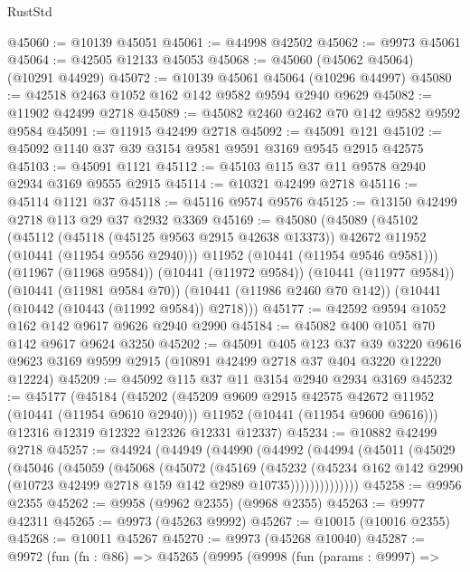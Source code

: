 \begin{lexlean}{RustStd}
\begin{coremodule}
@45060 := @10139 @45051
@45061 := @44998 @42502
@45062 := @9973 @45061
@45064 := @42505 @12133 @45053
@45068 := @45060 (@45062 @45064) (@10291 @44929)
@45072 := @10139 @45061 @45064 (@10296 @44997)
@45080 := @42518 @2463 @1052 @162 @142 @9582 @9594 @2940 @9629
@45082 := @11902 @42499 @2718
@45089 := @45082 @2460 @2462 @70 @142 @9582 @9592 @9584
@45091 := @11915 @42499 @2718
@45092 := @45091 @121
@45102 := @45092 @1140 @37 @39 @3154 @9581 @9591 @3169 @9545 @2915 @42575
@45103 := @45091 @1121
@45112 := @45103 @115 @37 @11 @9578 @2940 @2934 @3169 @9555 @2915
@45114 := @10321 @42499 @2718
@45116 := @45114 @1121 @37
@45118 := @45116 @9574 @9576
@45125 := @13150 @42499 @2718 @113 @29 @37 @2932 @3369
@45169 := @45080
    (@45089
      (@45102
        (@45112
          (@45118 (@45125 @9563 @2915 @42638 @13373))
          @42672
          @11952
          (@10441 (@11954 @9556 @2940)))
        @11952
        (@10441 (@11954 @9546 @9581)))
      (@11967 (@11968 @9584))
      (@10441 (@11972 @9584))
      (@10441 (@11977 @9584))
      (@10441 (@11981 @9584 @70))
      (@10441 (@11986 @2460 @70 @142))
      (@10441 (@10442 (@10443 (@11992 @9584)) @2718)))
@45177 := @42592 @9594 @1052 @162 @142 @9617 @9626 @2940 @2990
@45184 := @45082 @400 @1051 @70 @142 @9617 @9624 @3250
@45202 := @45091
    @405
    @123
    @37
    @39
    @3220
    @9616
    @9623
    @3169
    @9599
    @2915
    (@10891 @42499 @2718 @37 @404 @3220 @12220 @12224)
@45209 := @45092 @115 @37 @11 @3154 @2940 @2934 @3169
@45232 := @45177
    (@45184
      (@45202
        (@45209 @9609 @2915 @42575 @42672 @11952 (@10441 (@11954 @9610 @2940)))
        @11952
        (@10441 (@11954 @9600 @9616)))
      @12316
      @12319
      @12322
      @12326
      @12331
      @12337)
@45234 := @10882 @42499 @2718
@45257 := @44924
    (@44949
      (@44990
        (@44992
          (@44994
            (@45011
              (@45029
                (@45046
                  (@45059
                    (@45068
                      (@45072
                        (@45169
                          (@45232
                            (@45234
                              @162
                              @142
                              @2990
                              (@10723 @42499 @2718 @159 @142 @2989 @10735))))))))))))))
@45258 := @9956 @2355
@45262 := @9958 (@9962 @2355) (@9968 @2355)
@45263 := @9977 @42311
@45265 := @9973 (@45263 @9992)
@45267 := @10015 (@10016 @2355)
@45268 := @10011 @45267
@45270 := @9973 (@45268 @10040)
@45287 := @9972
    (fun (fn : @86) =>
    @45265
      (@9995
        (@9998
          (fun (params : @9997) =>

\end{coremodule}
\end{lexlean}
